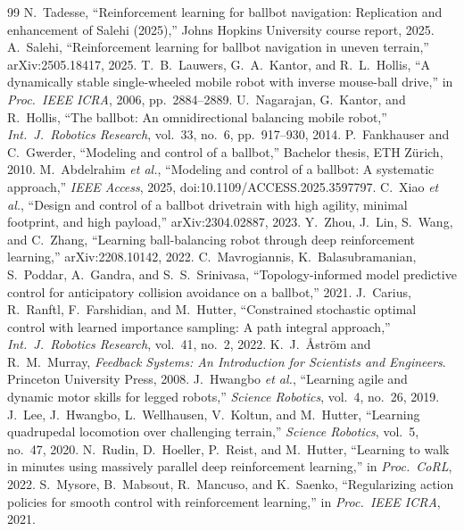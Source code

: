 \documentclass[conference]{IEEEtran}
\theoremstyle{remark}
\begin{document}
\begin{thebibliography}{99}\small
{} N.~Tadesse, ``Reinforcement learning for ballbot navigation: Replication and enhancement of Salehi (2025),'' Johns Hopkins University course report, 2025.
 A.~Salehi, ``Reinforcement learning for ballbot navigation in uneven terrain,'' arXiv:2505.18417, 2025.
 T.~B.~Lauwers, G.~A.~Kantor, and R.~L.~Hollis, ``A dynamically stable single-wheeled mobile robot with inverse mouse-ball drive,'' in \emph{Proc.\ IEEE ICRA}, 2006, pp.~2884--2889.
 U.~Nagarajan, G.~Kantor, and R.~Hollis, ``The ballbot: An omnidirectional balancing mobile robot,'' \emph{Int.\ J.\ Robotics Research}, vol.~33, no.~6, pp.~917--930, 2014.
 P.~Fankhauser and C.~Gwerder, ``Modeling and control of a ballbot,'' Bachelor thesis, ETH Z\"urich, 2010.
 M.~Abdelrahim \emph{et al.}, ``Modeling and control of a ballbot: A systematic approach,'' \emph{IEEE Access}, 2025, doi:10.1109/ACCESS.2025.3597797.
 C.~Xiao \emph{et al.}, ``Design and control of a ballbot drivetrain with high agility, minimal footprint, and high payload,'' arXiv:2304.02887, 2023.
 Y.~Zhou, J.~Lin, S.~Wang, and C.~Zhang, ``Learning ball-balancing robot through deep reinforcement learning,'' arXiv:2208.10142, 2022.
 C.~Mavrogiannis, K.~Balasubramanian, S.~Poddar, A.~Gandra, and S.~S.~Srinivasa, ``Topology-informed model predictive control for anticipatory collision avoidance on a ballbot,'' 2021.
 J.~Carius, R.~Ranftl, F.~Farshidian, and M.~Hutter, ``Constrained stochastic optimal control with learned importance sampling: A path integral approach,'' \emph{Int.\ J.\ Robotics Research}, vol.~41, no.~2, 2022.
 K.~J.~\AA str\"om and R.~M.~Murray, \emph{Feedback Systems: An Introduction for Scientists and Engineers}. Princeton University Press, 2008.
 J.~Hwangbo \emph{et al.}, ``Learning agile and dynamic motor skills for legged robots,'' \emph{Science Robotics}, vol.~4, no.~26, 2019.
 J.~Lee, J.~Hwangbo, L.~Wellhausen, V.~Koltun, and M.~Hutter, ``Learning quadrupedal locomotion over challenging terrain,'' \emph{Science Robotics}, vol.~5, no.~47, 2020.
 N.~Rudin, D.~Hoeller, P.~Reist, and M.~Hutter, ``Learning to walk in minutes using massively parallel deep reinforcement learning,'' in \emph{Proc.\ CoRL}, 2022.
 S.~Mysore, B.~Mabsout, R.~Mancuso, and K.~Saenko, ``Regularizing action policies for smooth control with reinforcement learning,'' in \emph{Proc.\ IEEE ICRA}, 2021.

\end{thebibliography}
\end{document}

